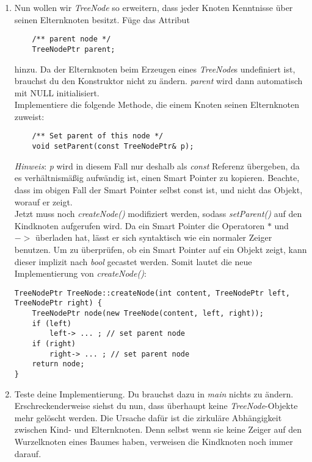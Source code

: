 \begin{enumerate}
\item Nun wollen wir \emph{TreeNode} so erweitern, dass jeder Knoten Kenntnisse über seinen Elternknoten besitzt.
Füge das Attribut  
\begin{lstlisting}
	/** parent node */
	TreeNodePtr parent;
\end{lstlisting}

hinzu.
Da der Elternknoten beim Erzeugen eines \emph{TreeNode}s undefiniert ist, brauchst du den Konstruktor nicht zu ändern. \emph{parent} wird dann automatisch mit NULL initialisiert.\\

Implementiere die folgende Methode, die einem Knoten seinen Elternknoten zuweist:
\begin{lstlisting}
	/** Set parent of this node */
	void setParent(const TreeNodePtr& p);
\end{lstlisting}

\emph{Hinweis}:
\emph{p} wird in diesem Fall nur deshalb als \emph{const} Referenz übergeben, da es verhältnismäßig aufwändig ist, einen Smart Pointer zu kopieren.
Beachte, dass im obigen Fall der Smart Pointer selbst const ist, und nicht das Objekt, worauf er zeigt.\\

Jetzt muss noch \emph{createNode()} modifiziert werden, sodass \emph{setParent()} auf den Kindknoten aufgerufen wird. Da ein Smart Pointer die Operatoren $*$ und $->$ überladen hat, lässt er sich syntaktisch wie ein normaler Zeiger benutzen. Um zu überprüfen, ob ein Smart Pointer auf ein Objekt zeigt, kann dieser implizit nach \emph{bool} gecastet werden. Somit lautet die neue Implementierung von \emph{createNode()}:

\begin{lstlisting}
TreeNodePtr TreeNode::createNode(int content, TreeNodePtr left, TreeNodePtr right) {
	TreeNodePtr node(new TreeNode(content, left, right));
	if (left)
		left-> ... ; // set parent node
	if (right)
		right-> ... ; // set parent node
	return node;
}
\end{lstlisting}

\item
Teste deine Implementierung.
Du brauchst dazu in \emph{main} nichts zu ändern.\\

Erschreckenderweise siehst du nun, dass überhaupt keine \emph{TreeNode}-Objekte mehr gelöscht werden.
Die Ursache dafür ist die zirkuläre Abhängigkeit zwischen Kind- und Elternknoten.
Denn selbst wenn sie keine Zeiger auf den Wurzelknoten eines Baumes haben, verweisen die Kindknoten noch immer darauf. \\


\end{enumerate}

